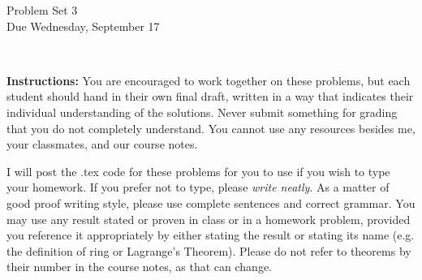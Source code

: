 \documentclass[11pt]{article}
\title{}
\date{\vspace{-0.5in}}
\theoremstyle{definition}
\begin{document}
\thispagestyle{fancy}
\pagestyle{fancy}

\vspace{3em}

\begin{center}
	{\LARGE Problem Set 3 \\}
	Due Wednesday, September 17
\end{center}

\

\noindent
{\bf Instructions:}
You are encouraged to work together on these problems, but each student should hand in their own final draft, written in a way that indicates their individual understanding of the solutions. Never submit something for grading that you do not completely understand. You cannot use any resources besides me, your classmates, and our course notes.


I will post the .tex code for these problems for you to use if you wish to type your homework. If you prefer not to type, please  {\em write neatly}. As a matter of good proof writing style, please use complete sentences and correct grammar. You may use any result stated or proven in class or in a homework problem, provided you reference it appropriately by either stating the result or stating its name (e.g. the definition of ring or Lagrange's Theorem). Please do not refer to theorems by their number in the course notes, as that can change.


\




\
\end{document}
